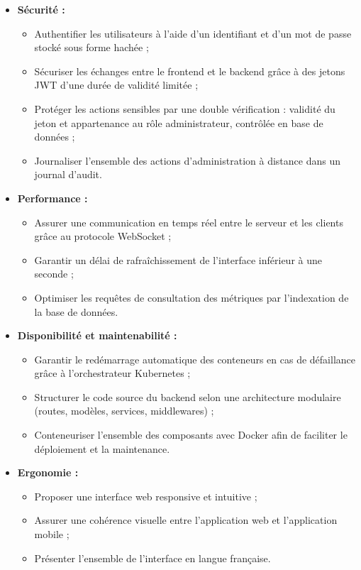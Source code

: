 \begin{itemize}[label=]
\item \textbf{Sécurité :}
\begin{itemize}[label=]
    \item Authentifier les utilisateurs à l'aide d'un identifiant et d'un mot de passe
          stocké sous forme hachée ;
    \item Sécuriser les échanges entre le frontend et le backend grâce à des jetons JWT
          d'une durée de validité limitée ;
    \item Protéger les actions sensibles par une double vérification : validité du jeton
          et appartenance au rôle administrateur, contrôlée en base de données ;
    \item Journaliser l'ensemble des actions d'administration à distance dans un journal
          d'audit.
\end{itemize}

\item \textbf{Performance :}
\begin{itemize}[label=]
    \item Assurer une communication en temps réel entre le serveur et les clients grâce
          au protocole WebSocket ;
    \item Garantir un délai de rafraîchissement de l'interface inférieur à une seconde ;
    \item Optimiser les requêtes de consultation des métriques par l'indexation de la
          base de données.
\end{itemize}

\item \textbf{Disponibilité et maintenabilité :}
\begin{itemize}[label=]
    \item Garantir le redémarrage automatique des conteneurs en cas de défaillance grâce
          à l'orchestrateur Kubernetes ;
    \item Structurer le code source du backend selon une architecture modulaire (routes,
          modèles, services, middlewares) ;
    \item Conteneuriser l'ensemble des composants avec Docker afin de faciliter le
          déploiement et la maintenance.
\end{itemize}

\item \textbf{Ergonomie :}
\begin{itemize}[label=]
    \item Proposer une interface web responsive et intuitive ;
    \item Assurer une cohérence visuelle entre l'application web et l'application mobile ;
    \item Présenter l'ensemble de l'interface en langue française.
\end{itemize}


\end{itemize}
